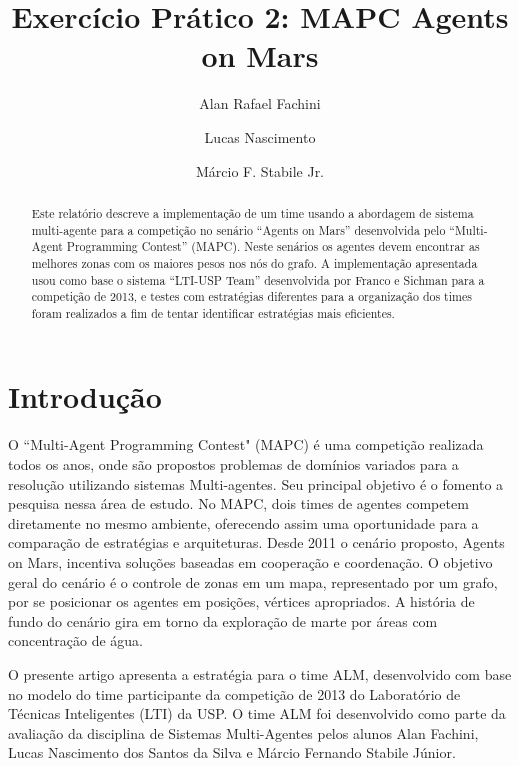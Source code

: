 \documentclass{llncs}
\begin{document}
\title{Exercício Prático 2: MAPC Agents on Mars}

\author{Alan Rafael Fachini \and Lucas Nascimento \and Márcio F. Stabile Jr.}

\maketitle

\begin{abstract}
Este relatório descreve a implementação de um time usando a abordagem de sistema multi-agente para a competição no senário ``Agents on Mars'' desenvolvida pelo ``Multi-Agent Programming Contest'' (MAPC). Neste senários os agentes devem encontrar as melhores zonas com os maiores pesos nos nós do grafo. A implementação apresentada usou como base o sistema ``LTI-USP Team'' desenvolvida por Franco e Sichman \cite{franco2013improving} para a competição de 2013, e testes com estratégias diferentes para a organização dos times foram realizados a fim de tentar identificar estratégias mais eficientes.
\end{abstract}

\section{Introdução}

O “Multi-Agent Programming Contest" (MAPC) é uma competição realizada todos os anos, onde são propostos problemas de domínios variados para a resolução utilizando sistemas Multi-agentes. Seu principal objetivo é o fomento a pesquisa nessa área de estudo. No MAPC, dois times de agentes competem diretamente no mesmo ambiente, oferecendo assim uma oportunidade para a comparação de estratégias e arquiteturas. Desde 2011 o cenário proposto, Agents on Mars, incentiva soluções baseadas em cooperação e coordenação. O objetivo geral do cenário é o controle de zonas em um mapa, representado por um grafo, por se posicionar os agentes em posições, vértices apropriados. A história de fundo do cenário gira em torno da exploração de marte por áreas com concentração de água.

O presente artigo apresenta a estratégia para o time ALM, desenvolvido com base no modelo do time participante da competição de 2013 do Laboratório de Técnicas Inteligentes (LTI) da USP. O time ALM foi desenvolvido como parte da avaliação da disciplina de Sistemas Multi-Agentes pelos alunos Alan Fachini, Lucas Nascimento dos Santos da Silva e Márcio Fernando Stabile Júnior.
\end{document}
